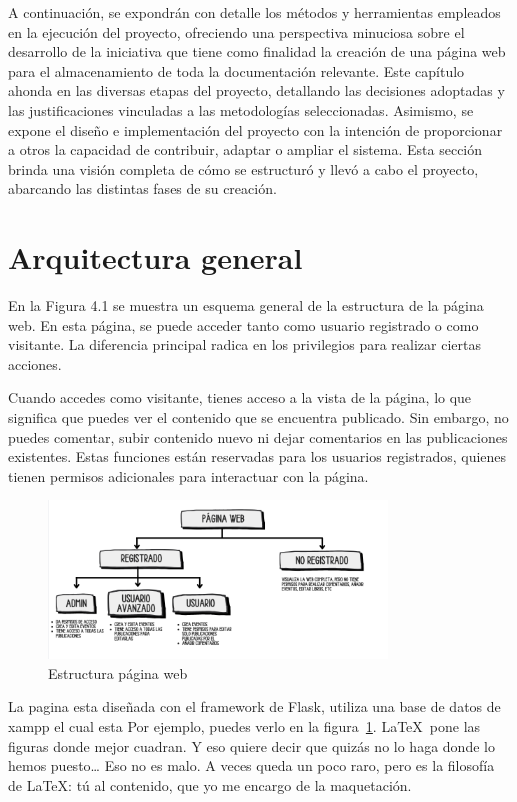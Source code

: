 \documentclass[a4paper, 12pt]{book}
\begin{document}
A continuación, se expondrán con detalle los métodos y herramientas empleados en la ejecución del proyecto, 
ofreciendo una perspectiva minuciosa sobre el desarrollo de la iniciativa que tiene como finalidad la creación 
de una página web para el almacenamiento de toda la documentación relevante. Este capítulo ahonda en las diversas 
etapas del proyecto, detallando las decisiones adoptadas y las justificaciones vinculadas a las metodologías seleccionadas. 
Asimismo, se expone el diseño e implementación del proyecto con la intención de proporcionar a otros la capacidad de 
contribuir, adaptar o ampliar el sistema. Esta sección brinda una visión completa de cómo se estructuró y llevó a cabo 
el proyecto, abarcando las distintas fases de su creación.



\section{Arquitectura general} 
\label{sec:arquitectura}


En la Figura 4.1 se muestra un esquema general de la estructura de la página web. En esta página, 
se puede acceder tanto como usuario registrado o como visitante. La diferencia principal radica en 
los privilegios para realizar ciertas acciones.

Cuando accedes como visitante, tienes acceso a la vista de la página, lo que significa que puedes 
ver el contenido que se encuentra publicado. Sin embargo, no puedes comentar, subir contenido nuevo 
ni dejar comentarios en las publicaciones existentes. Estas funciones están reservadas para los usuarios 
registrados, quienes tienen permisos adicionales para interactuar con la página.
\begin{figure}
  \centering
  \includegraphics[width=9cm, keepaspectratio]{img/esquema.png}
  \caption{Estructura página web}
  \label{fig:arquitectura}
\end{figure}

La pagina esta diseñada con el framework de Flask, utiliza una base de datos de xampp el cual esta
Por ejemplo, puedes verlo en la figura~\ref{fig:arquitectura}.
\LaTeX \ pone las figuras donde mejor cuadran. 
Y eso quiere decir que quizás no lo haga donde lo hemos puesto\ldots 
Eso no es malo.
A veces queda un poco raro, pero es la filosofía de \LaTeX: tú al contenido, que yo me encargo de la maquetación.
\end{document}
